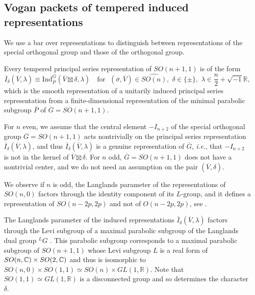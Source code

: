 \subsection{Vogan packets of tempered induced representations}
\label{subsec:Vpacket}

We use a bar
 over representations to distinguish
 between representations of the special orthogonal group
 and those of the orthogonal group.

\medskip
 Every tempered principal series representation of $SO(n+1,1)$ is of the form
\[
  \overline{I}_{\delta}(\overline{V},\lambda) 
  \equiv
  \mbox{Ind}_{\overline{P}}^{\overline{G}}(\overline{V} \boxtimes \delta ,\lambda ) 
\quad \text{for }\,\,(\overline{\sigma},\overline{V}) \in \widehat{SO(n)}, 
\,\, \delta \in \{\pm\}, 
\,\, \lambda \in \frac n 2 + \sqrt{-1}{\mathbb{R}}, 
\]
which is the smooth representation
 of a unitarily induced principal series representation from a finite-dimensional representation of the minimal parabolic subgroup 
$\overline P$
 of $\overline G=SO(n+1,1)$.  



For $n$ even,
 we assume that the central element $-I_{n+2}$
 of the special orthogonal group $\overline G=SO(n+1,1)$ acts nontrivially
 on the principal series representation  
 ${\overline{I}}_{\delta}(\overline{V},\lambda)$, 
 and thus $\overline I_{\delta}(\overline V, \lambda)$ is a genuine representation
 of $\overline G$,
{\it{i.e.}},
 that $-I_{n+2}$ is not in the kernel of $\overline{V} \boxtimes \delta.$ 
For $n$ odd,
 $\overline G=SO(n+1,1)$ does not have
 a nontrivial center,
 and we do not need an assumption
 on the pair $(\overline{V},\delta)$.  



We observe if $n$ is odd,
 the Langlands parameter of the representations
 of $SO(n,0)$ factors through the identity component of its $L$-group,
 and it defines a representation of $SO(n-2p,2p)$ and not of $O(n-2p,2p)$, 
 see \cite{Arthur}.  



The Langlands parameter  of the induced representations $ \overline{I}_{\delta}(\overline{V},\lambda)$ factors through the Levi subgroup of a maximal parabolic subgroup of the Langlands dual group 
$^L G$ \cite{LLNM}. 
This parabolic subgroup corresponds to a maximal parabolic subgroup
 of $SO(n+1,1)$
 whose Levi subgroup $L$ is a real form of $SO(n,{\mathbb C}) \times SO(2,{\mathbb C})$ and thus is isomorphic to $ SO(n,0) \times SO(1,1)\simeq SO(n) \times GL(1,{\mathbb{R}})$. 
Note that $SO(1,1)\simeq GL(1,{\mathbb{R}})$ is a disconnected group and so determines the character  $\delta $.  



